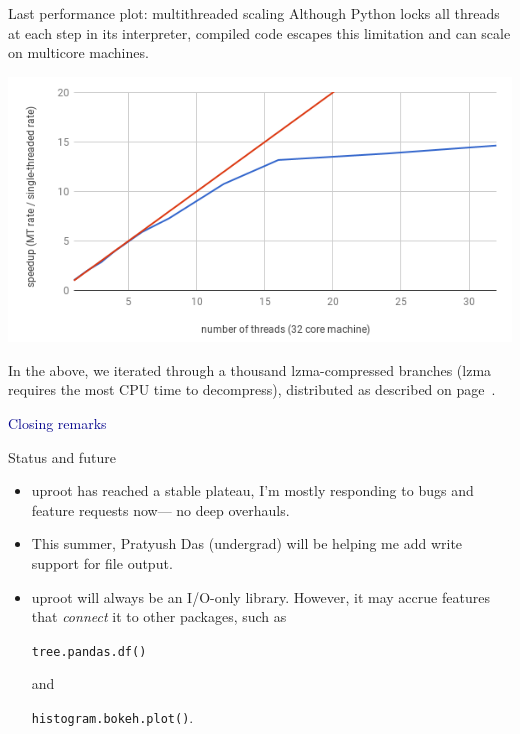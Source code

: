 \documentclass[aspectratio=169]{beamer}
\begin{document}
\begin{frame}{Last performance plot: multithreaded scaling}
\vspace{0.5 cm}
Although Python locks all threads at each step in its interpreter, compiled code escapes this limitation and can scale on multicore machines.

\begin{center}
\includegraphics[width=0.65\linewidth]{scaling.png}
\end{center}

In the above, we iterated through a thousand lzma-compressed branches (lzma requires the most CPU time to decompress), distributed as described on page~\pageref{page:executor}.
\end{frame}

\begin{frame}{}
\begin{center}
\Huge \textcolor{darkblue}{Closing remarks}
\end{center}
\end{frame}

\begin{frame}{Status and future}
\vspace{0.5 cm}
\begin{center}
\begin{minipage}{0.95\linewidth}
\large
\begin{itemize}\setlength{\itemsep}{0.5 cm}
\item uproot has reached a stable plateau, I'm mostly responding to bugs and feature requests now--- no deep overhauls.
\item This summer, Pratyush Das (undergrad) will be helping me add write support for file output.
\item uproot will always be an I/O-only library. However, it may accrue features that {\it connect} it to other packages, such as

\vspace{0.1 cm}
{\tt\small tree.pandas.df()}

\vspace{0.1 cm}
and

\vspace{0.1 cm}
{\tt\small histogram.bokeh.plot()}.
\end{itemize}
\end{minipage}
\end{center}
\end{frame}
\end{document}

